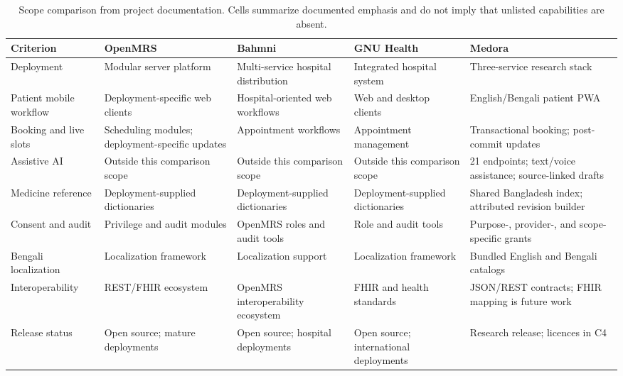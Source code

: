 \documentclass[preprint,12pt,a4paper]{elsarticle}
\newcommand{\tablerowsep}{\midrule}
\begin{document}
\begin{table}[!htbp]
\caption{Scope comparison from project documentation. Cells summarize documented emphasis and do not imply that unlisted capabilities are absent.}
\label{tab:related-work}
\scriptsize
\setlength{\tabcolsep}{3pt}
\begin{tabularx}{\textwidth}{@{}L{0.19\textwidth}YYYY@{}}
\toprule
\textbf{Criterion} & \textbf{OpenMRS}\cite{openmrs} & \textbf{Bahmni}\cite{bahmni} & \textbf{GNU Health}\cite{gnuhealth} & \textbf{Medora} \\
\midrule
Deployment & Modular server platform & Multi-service hospital distribution & Integrated hospital system & Three-service research stack \\
\tablerowsep
Patient mobile workflow & Deployment-specific web clients & Hospital-oriented web workflows & Web and desktop clients & English/Bengali patient PWA \\
\tablerowsep
Booking and live slots & Scheduling modules; deployment-specific updates & Appointment workflows & Appointment management & Transactional booking; post-commit updates \\
\tablerowsep
Assistive AI & Outside this comparison scope & Outside this comparison scope & Outside this comparison scope & 21 endpoints; text/voice assistance; source-linked drafts \\
\tablerowsep
Medicine reference & Deployment-supplied dictionaries & Deployment-supplied dictionaries & Deployment-supplied dictionaries & Shared Bangladesh index; attributed revision builder \\
\tablerowsep
Consent and audit & Privilege and audit modules & OpenMRS roles and audit tools & Role and audit tools & Purpose-, provider-, and scope-specific grants \\
\tablerowsep
Bengali localization & Localization framework & Localization support & Localization framework & Bundled English and Bengali catalogs \\
\tablerowsep
Interoperability & REST/FHIR ecosystem & OpenMRS interoperability ecosystem & FHIR and health standards & JSON/REST contracts; FHIR mapping is future work \\
\tablerowsep
Release status & Open source; mature deployments & Open source; hospital deployments & Open source; international deployments & Research release; licences in C4 \\
\bottomrule
\end{tabularx}

\end{table}
\end{document}
